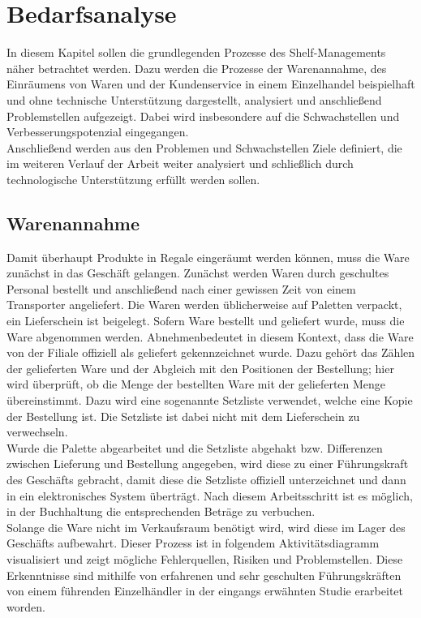 \chapter{Bedarfsanalyse}
\label{cha:bedarfsanalyse}
In diesem Kapitel sollen die grundlegenden Prozesse des Shelf-Managements näher betrachtet werden. Dazu werden die Prozesse der Warenannahme, des Einräumens von Waren und der Kundenservice in einem Einzelhandel beispielhaft und ohne technische Unterstützung dargestellt, analysiert und anschließend Problemstellen aufgezeigt. Dabei wird insbesondere auf die Schwachstellen und Verbesserungspotenzial eingegangen.\\
Anschließend werden aus den Problemen und Schwachstellen Ziele definiert, die im weiteren Verlauf der Arbeit weiter analysiert und schließlich durch technologische Unterstützung erfüllt werden sollen.

\section{Warenannahme}
\label{cha:warenannahme}
Damit überhaupt Produkte in Regale eingeräumt werden können, muss die Ware zunächst in das Geschäft gelangen. Zunächst werden Waren durch geschultes Personal bestellt und anschließend nach einer gewissen Zeit von einem Transporter angeliefert. Die Waren werden üblicherweise auf Paletten verpackt, ein Lieferschein ist beigelegt. Sofern Ware bestellt und geliefert wurde, muss die Ware abgenommen werden. \glqq Abnehmen\grqq bedeutet in diesem Kontext, dass die Ware von der Filiale offiziell als geliefert gekennzeichnet wurde. Dazu gehört das Zählen der gelieferten Ware und der Abgleich mit den Positionen der Bestellung; hier wird überprüft, ob die Menge der bestellten Ware mit der gelieferten Menge übereinstimmt. Dazu wird eine sogenannte Setzliste verwendet, welche eine Kopie der Bestellung ist. Die Setzliste ist dabei nicht mit dem Lieferschein zu verwechseln.\\

Wurde die Palette abgearbeitet und die Setzliste abgehakt bzw. Differenzen zwischen Lieferung und Bestellung angegeben, wird diese zu einer Führungskraft des Geschäfts gebracht, damit diese die Setzliste offiziell unterzeichnet und dann in ein elektronisches System überträgt. Nach diesem Arbeitsschritt ist es möglich, in der Buchhaltung die entsprechenden Beträge zu verbuchen.\\

Solange die Ware nicht im Verkaufsraum benötigt wird, wird diese im Lager des Geschäfts aufbewahrt. Dieser Prozess ist in folgendem Aktivitätsdiagramm visualisiert und zeigt mögliche Fehlerquellen, Risiken und Problemstellen. Diese Erkenntnisse sind mithilfe von erfahrenen und sehr geschulten Führungskräften von einem führenden Einzelhändler in der eingangs erwähnten Studie erarbeitet worden.\\

